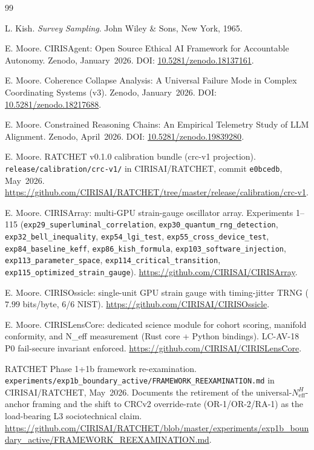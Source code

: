 \documentclass[11pt,a4paper]{article}
\begin{document}
\begin{thebibliography}{99}

 L. Kish. \emph{Survey Sampling}. John Wiley \& Sons, New York, 1965.

 E. Moore. CIRISAgent: Open Source Ethical AI Framework for Accountable Autonomy. Zenodo, January~2026. DOI: \href{https://doi.org/10.5281/zenodo.18137161}{10.5281/zenodo.18137161}.

 E. Moore. Coherence Collapse Analysis: A Universal Failure Mode in Complex Coordinating Systems (v3). Zenodo, January~2026. DOI: \href{https://doi.org/10.5281/zenodo.18217688}{10.5281/zenodo.18217688}.

 E. Moore. Constrained Reasoning Chains: An Empirical Telemetry Study of LLM Alignment. Zenodo, April~2026. DOI: \href{https://doi.org/10.5281/zenodo.19839280}{10.5281/zenodo.19839280}.

 E. Moore. RATCHET v0.1.0 calibration bundle (crc-v1 projection). \texttt{release/calibration/crc-v1/} in CIRISAI/RATCHET, commit \texttt{e0bcedb}, May~2026. \url{https://github.com/CIRISAI/RATCHET/tree/master/release/calibration/crc-v1}.

 E. Moore. CIRISArray: multi-GPU strain-gauge oscillator array. Experiments 1--115 (\texttt{exp29\_superluminal\_correlation}, \texttt{exp30\_quantum\_rng\_detection}, \texttt{exp32\_bell\_inequality}, \texttt{exp54\_lgi\_test}, \texttt{exp55\_cross\_device\_test}, \texttt{exp84\_baseline\_keff}, \texttt{exp86\_kish\_formula}, \texttt{exp103\_software\_injection}, \texttt{exp113\_parameter\_space}, \texttt{exp114\_critical\_transition}, \texttt{exp115\_optimized\_strain\_gauge}). \url{https://github.com/CIRISAI/CIRISArray}.

 E. Moore. CIRISOssicle: single-unit GPU strain gauge with timing-jitter TRNG ($7.99$ bits/byte, 6/6 NIST). \url{https://github.com/CIRISAI/CIRISOssicle}.

 E. Moore. CIRISLensCore: dedicated science module for cohort scoring, manifold conformity, and N\_eff measurement (Rust core + Python bindings). LC-AV-18 P0 fail-secure invariant enforced. \url{https://github.com/CIRISAI/CIRISLensCore}.

 RATCHET Phase 1+1b framework re-examination. \texttt{experiments/exp1b\_boundary\_active/FRAMEWORK\_REEXAMINATION.md} in CIRISAI/RATCHET, May~2026. Documents the retirement of the universal-$N_{\text{eff}}^H$-anchor framing and the shift to CRCv2 override-rate (OR-1/OR-2/RA-1) as the load-bearing L3 sociotechnical claim. \url{https://github.com/CIRISAI/RATCHET/blob/master/experiments/exp1b_boundary_active/FRAMEWORK_REEXAMINATION.md}.


\end{thebibliography}
\end{document}
